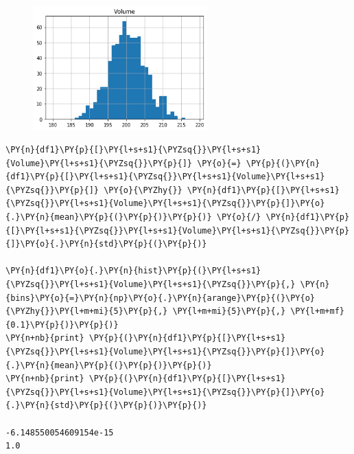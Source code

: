 \begin{figure}[h]
\centering
  \includegraphics[width=0.6\textwidth]{figures/Untitled_40_1.png}
\end{figure}

\begin{tcolorbox}[breakable, size=fbox, boxrule=1pt, pad at break*=1mm,colback=cellbackground, colframe=cellborder]
\begin{Verbatim}[commandchars=\\\{\}]
\PY{n}{df1}\PY{p}{[}\PY{l+s+s1}{\PYZsq{}}\PY{l+s+s1}{Volume}\PY{l+s+s1}{\PYZsq{}}\PY{p}{]} \PY{o}{=} \PY{p}{(}\PY{n}{df1}\PY{p}{[}\PY{l+s+s1}{\PYZsq{}}\PY{l+s+s1}{Volume}\PY{l+s+s1}{\PYZsq{}}\PY{p}{]} \PY{o}{\PYZhy{}} \PY{n}{df1}\PY{p}{[}\PY{l+s+s1}{\PYZsq{}}\PY{l+s+s1}{Volume}\PY{l+s+s1}{\PYZsq{}}\PY{p}{]}\PY{o}{.}\PY{n}{mean}\PY{p}{(}\PY{p}{)}\PY{p}{)} \PY{o}{/} \PY{n}{df1}\PY{p}{[}\PY{l+s+s1}{\PYZsq{}}\PY{l+s+s1}{Volume}\PY{l+s+s1}{\PYZsq{}}\PY{p}{]}\PY{o}{.}\PY{n}{std}\PY{p}{(}\PY{p}{)}

\PY{n}{df1}\PY{o}{.}\PY{n}{hist}\PY{p}{(}\PY{l+s+s1}{\PYZsq{}}\PY{l+s+s1}{Volume}\PY{l+s+s1}{\PYZsq{}}\PY{p}{,} \PY{n}{bins}\PY{o}{=}\PY{n}{np}\PY{o}{.}\PY{n}{arange}\PY{p}{(}\PY{o}{\PYZhy{}}\PY{l+m+mi}{5}\PY{p}{,} \PY{l+m+mi}{5}\PY{p}{,} \PY{l+m+mf}{0.1}\PY{p}{)}\PY{p}{)}
\PY{n+nb}{print} \PY{p}{(}\PY{n}{df1}\PY{p}{[}\PY{l+s+s1}{\PYZsq{}}\PY{l+s+s1}{Volume}\PY{l+s+s1}{\PYZsq{}}\PY{p}{]}\PY{o}{.}\PY{n}{mean}\PY{p}{(}\PY{p}{)}\PY{p}{)}
\PY{n+nb}{print} \PY{p}{(}\PY{n}{df1}\PY{p}{[}\PY{l+s+s1}{\PYZsq{}}\PY{l+s+s1}{Volume}\PY{l+s+s1}{\PYZsq{}}\PY{p}{]}\PY{o}{.}\PY{n}{std}\PY{p}{(}\PY{p}{)}\PY{p}{)}

-6.148550054609154e-15
1.0
\end{Verbatim}
\end{tcolorbox}

